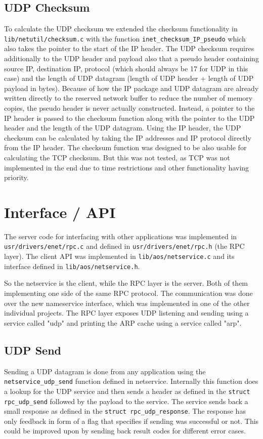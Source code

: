 \subsection{UDP Checksum}
To calculate the UDP checksum we extended the checksum functionality in \verb|lib/netutil/checksum.c| with the function \verb|inet_checksum_IP_pseudo| which also takes the pointer to the start of the IP header. The UDP checksum requires additionally to the UDP header and payload also that a pseudo header containing source IP, destination IP, protocol (which should always be 17 for UDP in this case) and the length of UDP datagram (length of UDP header + length of UDP payload in bytes).
Because of how the IP package and UDP datagram are already written directly to the reserved network buffer to reduce the number of memory copies, the pseudo header is never actually constructed. Instead, a pointer to the IP header is passed to the checksum function along with the pointer to the UDP header and the length of the UDP datagram. Using the IP header, the UDP checksum can be calculated by taking the IP addresses and IP protocol directly from the IP header.
The checksum function was designed to be also usable for calculating the TCP checksum. But this was not tested, as TCP was not implemented in the end due to time restrictions and other functionality having priority.

\section{Interface / API}
The server code for interfacing with other applications was implemented in \verb|usr/drivers/enet/rpc.c| and defined in \verb|usr/drivers/enet/rpc.h| (the RPC layer). The client API was implemented in \verb|lib/aos/netservice.c| and its interface defined in \verb|lib/aos/netservice.h|.

So the netservice is the client, while the RPC layer is the server. Both of them implementing one side of the same RPC protocol. The communication was done over the new nameservice interface, which was implemented in one of the other individual projects. The RPC layer exposes UDP listening and sending using a service called "udp" and printing the ARP cache using a service called "arp".

\subsection{UDP Send}
Sending a UDP datagram is done from any application using the \verb|netservice_udp_send| function defined in netservice. Internally this function does a lookup for the UDP service and then sends a header as defined in the \verb|struct rpc_udp_send| followed by the payload to the service. The service sends back a small response as defined in the \verb|struct rpc_udp_response|.
The response has only feedback in form of a flag that specifies if sending was successful or not. This could be improved upon by sending back result codes for different error cases.

